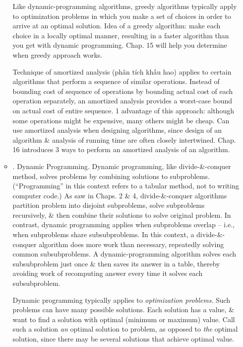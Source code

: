 \documentclass{article}
\begin{document}
\begin{itemize}
\begin{itemize}
		Like dynamic-programming algorithms, greedy algorithms typically apply to optimization problems in which you make a set of choices in order to arrive at an optimal solution. Idea of a greedy algorithm: make each choice in a locally optimal manner, resulting in a faster algorithm than you get with dynamic programming. Chap. 15 will help you determine when greedy approach works.
		
		Technique of amortized analysis (phân tích khấu hao) applies to certain algorithms that perform a sequence of similar operations. Instead of bounding cost of sequence of operations by bounding actual cost of each operation separately, an amortized analysis provides a worst-case bound on actual cost of entire sequence. 1 advantage of this approach: although some operations might be expensive, many others might be cheap. Can use amortized analysis when designing algorithms, since design of an algorithm \& analysis of running time are often closely intertwined. Chap. 16 introduces 3 ways to perform an amortized analysis of an algorithm.
		\item {. Dynamic Programming.} Dynamic programming, like divide-\&-conquer method, solves problems by combining solutions to subproblems. (``Programming'' in this context refers to a tabular method, not to writing computer code.) As saw in Chaps. 2 \& 4, divide-\&-conquer algorithms partition problem into disjoint subproblems, solve subproblems recursively, \& then combine their solutions to solve original problem. In contrast, dynamic programming applies when subproblems overlap -- i.e., when subproblems share subsubproblems. In this context, a divide-\&-conquer algorithm does more work than necessary, repeatedly solving common subsubproblems. A dynamic-programming algorithm solves each subsubproblem just once \& then saves its answer in a table, thereby avoiding work of recomputing answer every time it solves each subsubproblem.
		
		Dynamic programming typically applies to {\it optimization problems}. Such problems can have many possible solutions. Each solution has a value, \& want to find a solution with optimal (minimum or maximum) value. Call such a solution {\it an} optimal solution to problem, as opposed to {\it the} optimal solution, since there may be several solutions that achieve optimal value.
		

\end{itemize}
\end{itemize}
\end{document}
